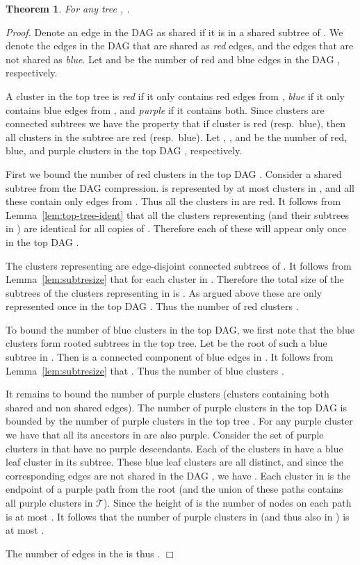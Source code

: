 \documentclass [11pt]{article}
\newtheorem{theorem}{Theorem}
\newcommand{\qed}{\hfill\ensuremath{\Box}\medskip\\\noindent}
\newenvironment{proof}{\noindent\emph{Proof. }}{}
\newcommand{\TT}{\ensuremath{\mathcal{T}}}
\begin{document}
\begin{theorem}\label{theo:ub}
For any tree , .
\end{theorem}
\begin{proof}
Denote an edge in the DAG as shared if it is in a shared subtree of . We denote the edges in the DAG  that are shared as \emph{red} edges, and the edges that are not shared as \emph{blue}. Let  and  be the number of red  and blue edges in the DAG , respectively.

A cluster in the top tree  is \emph{red} if it only contains red edges from , \emph{blue} if it only contains blue edges from , and \emph{purple} if it contains both. Since clusters are connected subtrees we have the property that if cluster  is red (resp.\ blue), then all clusters in the subtree  are red (resp.\ blue). 
Let , , and  be the number of red, blue, and purple clusters in the top DAG , respectively. 





First we bound the number of red clusters in the top DAG . Consider a shared subtree  from the DAG compression.  is represented by at most  clusters in , and all these contain only edges from . Thus all the clusters in  are red.
It follows from Lemma~\ref{lem:top-tree-ident} that all the clusters representing  (and their subtrees in ) are identical for all copies of  . Therefore each of these will appear only once in the top DAG . 

The clusters representing  are edge-disjoint connected subtrees of . 
It follows from Lemma~\ref{lem:subtresize} that  for each cluster in . 
Therefore the total size of the subtrees of the clusters representing  in  is .  As argued above these are only represented once in the top DAG . Thus the number of red clusters . 


To bound the number of blue clusters in the top DAG, we first note that the blue clusters form rooted subtrees in the top tree.  Let  be the root of such a blue subtree in . Then  is a connected component of blue edges in . It follows from Lemma~\ref{lem:subtresize} that 
. Thus the number of blue clusters .

It remains to bound the number  of purple clusters (clusters containing both shared and non shared edges). The number of purple clusters in the top DAG  is bounded by the number of purple clusters in the top tree . For any purple cluster we have that all its ancestors in  are also purple. Consider the set  of purple clusters in  that have no purple descendants. Each of the clusters in  have a blue leaf cluster in its subtree. These blue leaf clusters are all distinct, and since the corresponding edges are not shared in the DAG , we have . Each cluster in  is the endpoint of a purple path from the root (and the union of these paths contains all purple clusters in \TT). Since the height of  is  the number of nodes on each path is at most . It follows that the number of purple clusters in  (and thus also in ) is at most .



The number of edges in the  is thus 
. \qed
\end{proof}
\end{document}
